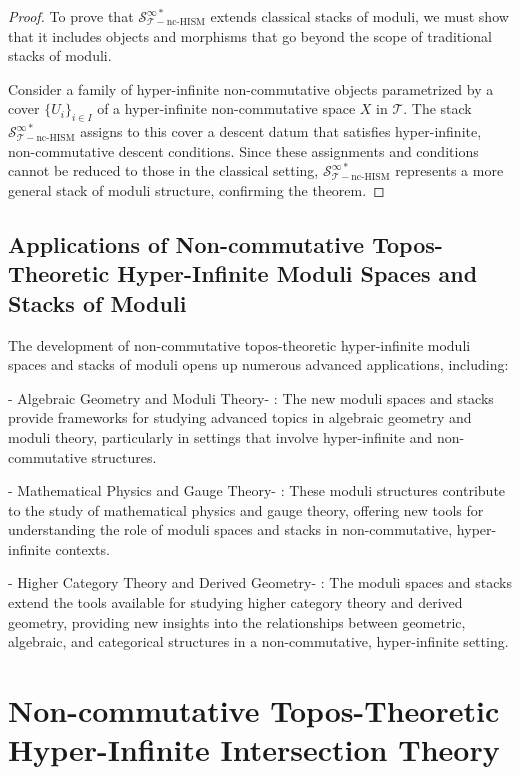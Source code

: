 \documentclass{article}
\begin{document}
\begin{proof}
To prove that \(\mathcal{S}_{\mathcal{T}-\text{nc-HISM}}^{\infty *}\) extends classical stacks of moduli, we must show that it includes objects and morphisms that go beyond the scope of traditional stacks of moduli.

Consider a family of hyper-infinite non-commutative objects parametrized by a cover \(\{U_i\}_{i \in I}\) of a hyper-infinite non-commutative space \(X\) in \(\mathcal{T}\). The stack \(\mathcal{S}_{\mathcal{T}-\text{nc-HISM}}^{\infty *}\) assigns to this cover a descent datum that satisfies hyper-infinite, non-commutative descent conditions. Since these assignments and conditions cannot be reduced to those in the classical setting, \(\mathcal{S}_{\mathcal{T}-\text{nc-HISM}}^{\infty *}\) represents a more general stack of moduli structure, confirming the theorem.
\end{proof}

\subsection{Applications of Non-commutative Topos-Theoretic Hyper-Infinite Moduli Spaces and Stacks of Moduli}
The development of non-commutative topos-theoretic hyper-infinite moduli spaces and stacks of moduli opens up numerous advanced applications, including:

-  Algebraic Geometry and Moduli Theory- : The new moduli spaces and stacks provide frameworks for studying advanced topics in algebraic geometry and moduli theory, particularly in settings that involve hyper-infinite and non-commutative structures.

-  Mathematical Physics and Gauge Theory- : These moduli structures contribute to the study of mathematical physics and gauge theory, offering new tools for understanding the role of moduli spaces and stacks in non-commutative, hyper-infinite contexts.

-  Higher Category Theory and Derived Geometry- : The moduli spaces and stacks extend the tools available for studying higher category theory and derived geometry, providing new insights into the relationships between geometric, algebraic, and categorical structures in a non-commutative, hyper-infinite setting.



\section{Non-commutative Topos-Theoretic Hyper-Infinite Intersection Theory}
\end{document}

